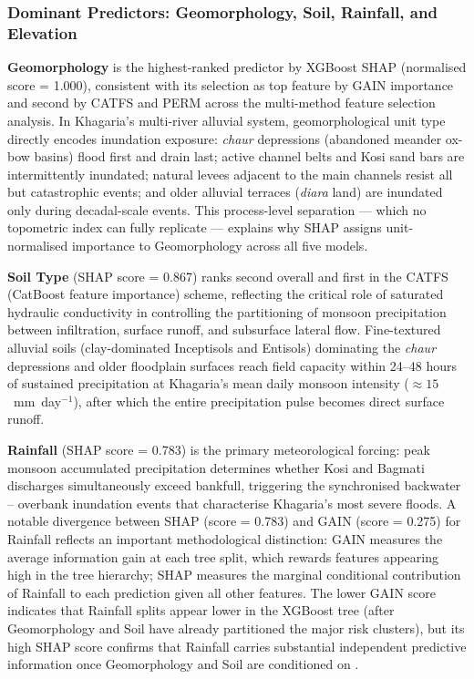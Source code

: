 \documentclass[12pt, a4paper]{article}
\begin{document}
\subsubsection{Dominant Predictors: Geomorphology, Soil, Rainfall, and Elevation}

\textbf{Geomorphology} is the highest-ranked predictor by XGBoost SHAP (normalised score = 1.000), consistent with its selection as top feature by GAIN importance and second by CATFS and PERM across the multi-method feature selection analysis.  In Khagaria's multi-river alluvial system, geomorphological unit type directly encodes inundation exposure: \textit{chaur} depressions (abandoned meander ox-bow basins) flood first and drain last; active channel belts and Kosi sand bars are intermittently inundated; natural levees adjacent to the main channels resist all but catastrophic events; and older alluvial terraces (\textit{diara} land) are inundated only during decadal-scale events.  This process-level separation --- which no topometric index can fully replicate --- explains why SHAP assigns unit-normalised importance to Geomorphology across all five models.

\textbf{Soil Type} (SHAP score = 0.867) ranks second overall and first in the CATFS (CatBoost feature importance) scheme, reflecting the critical role of saturated hydraulic conductivity in controlling the partitioning of monsoon precipitation between infiltration, surface runoff, and subsurface lateral flow. Fine-textured alluvial soils (clay-dominated Inceptisols and Entisols) dominating the \textit{chaur} depressions and older floodplain surfaces reach field capacity within 24--48 hours of sustained precipitation at Khagaria's mean daily monsoon intensity ($\approx 15$~mm~day$^{-1}$), after which the entire precipitation pulse becomes direct surface runoff.

\textbf{Rainfall} (SHAP score = 0.783) is the primary meteorological forcing: peak monsoon accumulated precipitation determines whether Kosi and Bagmati discharges simultaneously exceed bankfull, triggering the synchronised backwater -- overbank inundation events that characterise Khagaria's most severe floods. A notable divergence between SHAP (score = 0.783) and GAIN (score = 0.275) for Rainfall reflects an important methodological distinction: GAIN measures the average information gain at each tree split, which rewards features appearing high in the tree hierarchy; SHAP measures the marginal conditional contribution of Rainfall to each prediction given all other features.  The lower GAIN score indicates that Rainfall splits appear lower in the XGBoost tree (after Geomorphology and Soil have already partitioned the major risk clusters), but its high SHAP score confirms that Rainfall carries substantial independent predictive information once Geomorphology and Soil are conditioned on \citep{lundberg2020}.
\end{document}
